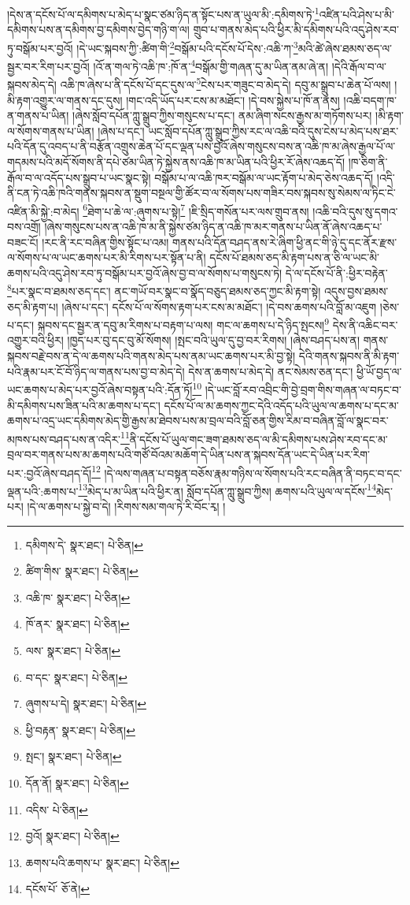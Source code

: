 །དེས་ན་དངོས་པོ་ལ་དམིགས་པ་མེད་པ་སྣང་ཙམ་ཉིད་ན་སྟོང་པས་ན་ཡུལ་མི་:དམིགས་ཏེ་\footnote{དམིགས་དེ་  སྣར་ཐང་།  པེ་ཅིན། }འཛིན་པའི་ཤེས་པ་མི་དམིགས་པས་ན་དམིགས་བྱ་དམིགས་བྱེད་གཉི་ག་ལ། གྲུབ་པ་གནས་མེད་པའི་ཕྱིར་མི་དམིགས་པའི་འདུ་ཤེས་རབ་ཏུ་བསྒོམ་པར་བྱའོ། །དེ་ཡང་སྐབས་ཀྱི་:ཚིག་གི་\footnote{ཚིག་གིས་  སྣར་ཐང་།  པེ་ཅིན། }བསྒོམ་པའི་དངོས་པོ་དེས་:འཆི་ཀ་\footnote{འཆི་ཁ་  སྣར་ཐང་།  པེ་ཅིན། }མའི་ཚེ་ཞེས་ཐམས་ཅད་ལ་སྦྱར་བར་རིག་པར་བྱའོ། །འོ་ན་གལ་ཏེ་འཆི་ཁ་:ཁོ་ན་\footnote{ཁོ་ནར་  སྣར་ཐང་།  པེ་ཅིན། }བསྒོམ་གྱི་གཞན་དུ་མ་ཡིན་ནམ་ཞེ་ན། །དེའི་རྒོལ་བ་ལ་སྐབས་མེད་དེ། འཆི་ཁ་ཞེས་པ་ནི་དངོས་པོ་དང་དུས་ལ་\footnote{ལས་  སྣར་ཐང་།  པེ་ཅིན། }ངེས་པར་གཟུང་བ་མེད་དེ། དབུ་མ་སྒྲུབ་པ་ཆེན་པོ་ལས། །མི་རྟག་འགྱུར་ལ་གནས་དང་དུས། །གང་འདི་ཡོད་པར་ངས་མ་མཐོང་། །དེ་བས་སྐྱེས་པ་ཁོ་ན་ནས། །འཆི་བདག་ཁ་ན་གནས་པ་ཡིན། །ཞེས་སློབ་དཔོན་ཀླུ་སྒྲུབ་ཀྱིས་གསུངས་པ་དང་། ནམ་ཞིག་སངས་རྒྱས་མ་གཏོགས་པར། །མི་རྟག་ལ་སོགས་གནས་པ་ཡིན། །ཞེས་པ་དང་། ཡང་སློབ་དཔོན་ཀླུ་སྒྲུབ་ཀྱིས་རང་ལ་འཆི་བའི་དུས་ངེས་པ་མེད་པས་ཐར་པའི་དོན་དུ་འབད་པ་ནི་བརྩོན་འགྲུས་ཆེན་པོ་དང་ལྡན་པས་བྱའོ་ཞེས་གསུངས་བས་ན་འཆི་ཁ་མ་ཞེས་རྒྱལ་པོ་ལ་གདམས་པའི་མདོ་སོགས་ནི་དཔེ་ཙམ་ཡིན་ཏེ་སྐྱེས་ནས་འཆི་ཁ་མ་ཡིན་པའི་ཕྱིར་རོ་ཞེས་འཆད་དོ། །ཁ་ཅིག་ནི་རྒོལ་བ་ལ་འདོད་པས་སྒྲུབ་པ་ཡང་སྣང་སྟེ། བསྒོམ་པ་ལ་འཆི་ཁར་བསྒོམ་ལ་ཡང་རྟོག་པ་མེད་ཅེས་འཆད་དོ། །འདི་ནི་ངན་ཏེ་འཆི་ཁའི་གནས་སྐབས་ན་སྡུག་བསྔལ་གྱི་ཚོར་བ་ལ་སོགས་པས་གཟིར་བས་སྐབས་སུ་སེམས་ལ་ཏིང་ངེ་འཛིན་མི་སྐྱེ་:བ་མེད། \footnote{བ་དང་  སྣར་ཐང་།  པེ་ཅིན། }ཐེག་པ་ཆེ་ལ་:ཞུགས་པ་སྟེ།\footnote{ཞུགས་པ་དེ།  སྣར་ཐང་།  པེ་ཅིན། } །ཇི་སྲིད་གསོན་པར་ལས་གྲུབ་ནས། །འཆི་བའི་དུས་སུ་དགའ་བས་འགྲོ། །ཞེས་གསུངས་པས་ན་འཆི་ཁ་མ་ནི་སྐྱེས་ཙམ་ཉིད་ན་འཆི་ཁ་མར་གནས་པ་ཡིན་ནོ་ཞེས་འཆད་པ་བཟང་ངོ། །རང་ནི་རང་བཞིན་གྱིས་སྟོང་པ་འམ། གནས་པའི་དོན་བཤད་ནས་རེ་ཞིག་ཕྱི་ནང་གི་ཉེ་དུ་དང་ནོར་རྫས་ལ་སོགས་པ་ལ་ཡང་ཆགས་པར་མི་རིགས་པར་སྟོན་པ་ནི། དངོས་པོ་ཐམས་ཅད་མི་རྟག་པས་ན་ཅི་ལ་ཡང་མི་ཆགས་པའི་འདུ་ཤེས་རབ་ཏུ་བསྒོམ་པར་བྱའོ་ཞེས་བྱ་བ་ལ་སོགས་པ་གསུངས་ཏེ། དེ་ལ་དངོས་པོ་ནི་:ཕྱིར་བརྟེན་\footnote{ཕྱི་བརྟན་  སྣར་ཐང་།  པེ་ཅིན། }པར་སྣང་བ་ཐམས་ཅད་དང་། ནང་གཡོ་བར་སྣང་བ་སྣོད་བཅུད་ཐམས་ཅད་ཀྱང་མི་རྟག་སྟེ། འདུས་བྱས་ཐམས་ཅད་མི་རྟག་པ། །ཞེས་པ་དང་། དངོས་པོ་ལ་སོགས་རྟག་པར་ངས་མ་མཐོང་། །དེ་བས་ཆགས་པའི་བློ་མ་འཇུག །ཅེས་པ་དང་། སྐབས་དང་སྦྱར་ན་དབུ་མ་རིགས་པ་བརྟག་པ་ལས། གང་ལ་ཆགས་པ་དེ་ཉིད་སྤངས།\footnote{སྤང་།  སྣར་ཐང་།  པེ་ཅིན། } དེས་ནི་འཆིང་བར་འགྱུར་བའི་ཕྱིར། །ཁྱད་པར་བུ་དང་བུ་མོ་སོགས། །སྤང་བའི་ཡུལ་དུ་བྱ་བར་རིགས། །ཞེས་བཤད་པས་ན། གནས་སྐབས་བརྗེ་བས་ན་དེ་ལ་ཆགས་པའི་གནས་མེད་པས་ནམ་ཡང་ཆགས་པར་མི་བྱ་སྟེ། དེའི་གནས་སྐབས་ནི་མི་རྟག་པའི་རྣམ་པར་ངོ་བོ་ཉིད་ལ་གནས་པས་བྱ་བ་མེད་དེ། དེས་ན་ཆགས་པ་མེད་དེ། ནང་སེམས་ཅན་དང་། ཕྱི་ཡོ་བྱད་ལ་ཡང་ཆགས་པ་མེད་པར་བྱའོ་ཞེས་བསྟན་པའི་:དོན་ཏོ།\footnote{དོན་ནོ།  སྣར་ཐང་།  པེ་ཅིན། } །དེ་ཡང་བློ་རབ་འབྲིང་གི་བྱེ་བྲག་གིས་གཞན་ལ་བཏང་བ་མི་དམིགས་པས་ཟིན་པའི་མ་ཆགས་པ་དང་། དངོས་པོ་ལ་མ་ཆགས་ཀྱང་དེའི་འདོད་པའི་ཡུལ་ལ་ཆགས་པ་དང་མ་ཆགས་པ་འདྲ་ཡང་དམིགས་མེད་གྱི་རྒྱས་མ་ཐེབས་པས་མ་བྲལ་བའི་བློ་ཅན་གྱིས་རིམ་བ་བཞིན་བློ་ལ་སྣང་བར་མཁས་པས་བཤད་པས་ན་འདིར་\footnote{འདིས་  པེ་ཅིན། }ནི་དངོས་པོ་ཡུལ་གང་ཟག་ཐམས་ཅད་ལ་མི་དམིགས་པས་ཤེས་རབ་དང་མ་བྲལ་བར་གནས་པས་མ་ཆགས་པའི་གཙོ་བོའམ་མཆོག་དེ་ཡིན་པས་ན་སྐབས་དོན་ཡང་དེ་ཡིན་པར་རིག་པར་:བྱའོ་ཞེས་བཤད་དོ།\footnote{བྱའོ།  སྣར་ཐང་།  པེ་ཅིན། } །དེ་ལས་གཞན་པ་བསྟན་བཅོས་རྣམ་གཉིས་ལ་སོགས་པའི་རང་བཞིན་ནི་བཏང་བ་དང་ལྡན་པའི་:ཆགས་པ་\footnote{ཆགས་པའི་ཆགས་པ་  སྣར་ཐང་།  པེ་ཅིན། }མེད་པ་མ་ཡིན་པའི་ཕྱིར་ན། སློབ་དཔོན་ཀླུ་སྒྲུབ་ཀྱིས། ཆགས་པའི་ཡུལ་ལ་དངོས་\footnote{དངོས་པོ་  ཅོ་ནེ། }མེད་པར། །དེ་ལ་ཆགས་པ་སྐྱེ་བ་དེ། །རིགས་སམ་གལ་ཏེ་རི་བོང་རྭ། །
